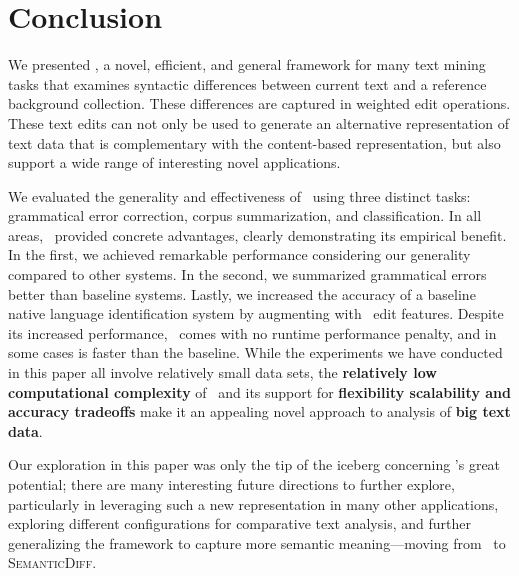 \section{Conclusion}
\label{sec:conclusion}

We presented \sd, a novel, efficient, and  general framework for many text
mining tasks that examines syntactic differences between current text and a
reference background collection. These differences are captured in weighted edit
operations. These text edits can not only be used to generate an alternative
representation of text data that is complementary with the content-based
representation, but also support a wide range of interesting novel applications.

We evaluated the generality and effectiveness of \sd~using three distinct tasks:
grammatical error correction, corpus summarization, and classification. In all
areas, \sd~provided concrete advantages, clearly demonstrating its empirical
benefit. In the first, we achieved remarkable performance considering our
generality compared to other systems. In the second, we summarized grammatical
errors better than baseline systems. Lastly, we increased the accuracy of a
baseline native language identification system by augmenting with \sd~edit
features. Despite its increased performance, \sd~comes with no runtime
performance penalty, and in some cases is faster than the baseline. While the
experiments we have conducted in this paper all involve relatively small data
sets, the {\bf relatively low computational complexity} of \sd~and its support
for {\bf flexibility scalability and accuracy tradeoffs} make it an appealing
novel approach to analysis of {\bf big text data}.

Our exploration in this paper was only the tip of the iceberg concerning \sd's
great potential; there are many interesting future directions to further
explore, particularly in leveraging such a new representation in many other
applications, exploring different configurations for comparative text analysis,
and further generalizing the framework to capture more semantic meaning---moving
from \sd~to \textsc{SemanticDiff}.
